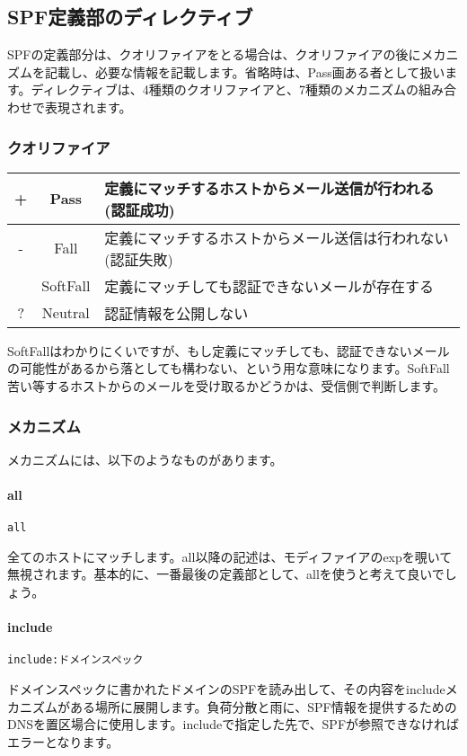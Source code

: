 \subsection{SPF定義部のディレクティブ}

SPFの定義部分は、クオリファイアをとる場合は、クオリファイアの後にメカニズムを記載し、必要な情報を記載します。省略時は、Pass画ある者として扱います。ディレクティブは、4種類のクオリファイアと、7種類のメカニズムの組み合わせで表現されます。

\subsubsection{クオリファイア}

\begin{tabular}{c|c|l}
 + & Pass & 定義にマッチするホストからメール送信が行われる(認証成功)\\\hline
 - & Fall & 定義にマッチするホストからメール送信は行われない(認証失敗)\\\hline
 ~ & SoftFall & 定義にマッチしても認証できないメールが存在する\\\hline
 ? & Neutral & 認証情報を公開しない\\\hline
\end{tabular}


SoftFallはわかりにくいですが、もし定義にマッチしても、認証できないメールの可能性があるから落としても構わない、という用な意味になります。SoftFall苦い等するホストからのメールを受け取るかどうかは、受信側で判断します。

\subsubsection{メカニズム}

メカニズムには、以下のようなものがあります。

\paragraph{all}
\begin{verbatim}
all
\end{verbatim}
全てのホストにマッチします。all以降の記述は、モディファイアのexpを覗いて無視されます。基本的に、一番最後の定義部として、allを使うと考えて良いでしょう。

\paragraph{include}
\begin{verbatim}
include:ドメインスペック
\end{verbatim}
ドメインスペックに書かれたドメインのSPFを読み出して、その内容をincludeメカニズムがある場所に展開します。負荷分散と雨に、SPF情報を提供するためのDNSを置区場合に使用します。includeで指定した先で、SPFが参照できなければエラーとなります。

